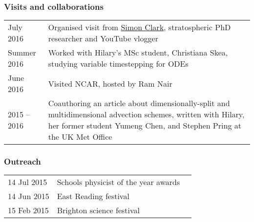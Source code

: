 \documentclass[a4paper,11pt]{article}
\begin{document}
\subsubsection*{Visits and collaborations}
\begin{tabularx}{\linewidth}{l X}
July 2016 & Organised visit from \href{https://www.youtube.com/user/SimonOxfPhys}{Simon Clark}, stratospheric PhD researcher and YouTube vlogger \\
Summer 2016 & Worked with Hilary's MSc student, Christiana Skea, studying variable timestepping for ODEs \\
June 2016 & Visited NCAR, hosted by Ram Nair \\
2015 -- 2016 & Coauthoring an article about dimensionally-split and multidimensional advection schemes, written with Hilary, her former student Yumeng Chen, and Stephen Pring at the UK Met Office \\
\end{tabularx}

\subsubsection*{Outreach}
\begin{tabular}{l l l}
14 Jul 2015 & Schools physicist of the year awards \\
14 Jun 2015 & East Reading festival \\
15 Feb 2015 & Brighton science festival \\
\end{tabular}
\end{document}
